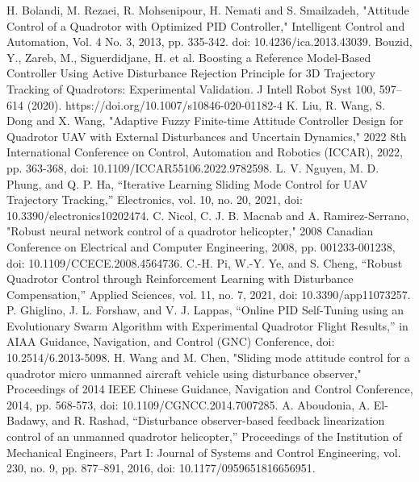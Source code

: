 \documentclass[conference]{IEEEtran}
\begin{document}

\begin{thebibliography}{00}
 H. Bolandi, M. Rezaei, R. Mohsenipour, H. Nemati and S. Smailzadeh, "Attitude Control of a Quadrotor with Optimized PID Controller," Intelligent Control and Automation, Vol. 4 No. 3, 2013, pp. 335-342. doi: 10.4236/ica.2013.43039.
 Bouzid, Y., Zareb, M., Siguerdidjane, H. et al. Boosting a Reference Model-Based Controller Using Active Disturbance Rejection Principle for 3D Trajectory Tracking of Quadrotors: Experimental Validation. J Intell Robot Syst 100, 597–614 (2020). https://doi.org/10.1007/s10846-020-01182-4
 K. Liu, R. Wang, S. Dong and X. Wang, "Adaptive Fuzzy Finite-time Attitude Controller Design for Quadrotor UAV with External Disturbances and Uncertain Dynamics," 2022 8th International Conference on Control, Automation and Robotics (ICCAR), 2022, pp. 363-368, doi: 10.1109/ICCAR55106.2022.9782598.
 L. V. Nguyen, M. D. Phung, and Q. P. Ha, “Iterative Learning Sliding Mode Control for UAV Trajectory Tracking,” Electronics, vol. 10, no. 20, 2021, doi: 10.3390/electronics10202474.
 C. Nicol, C. J. B. Macnab and A. Ramirez-Serrano, "Robust neural network control of a quadrotor helicopter," 2008 Canadian Conference on Electrical and Computer Engineering, 2008, pp. 001233-001238, doi: 10.1109/CCECE.2008.4564736.
 C.-H. Pi, W.-Y. Ye, and S. Cheng, “Robust Quadrotor Control through Reinforcement Learning with Disturbance Compensation,” Applied Sciences, vol. 11, no. 7, 2021, doi: 10.3390/app11073257.
 P. Ghiglino, J. L. Forshaw, and V. J. Lappas, “Online PID Self-Tuning using an Evolutionary Swarm Algorithm with Experimental Quadrotor Flight Results,” in AIAA Guidance, Navigation, and Control (GNC) Conference, doi: 10.2514/6.2013-5098.
 H. Wang and M. Chen, "Sliding mode attitude control for a quadrotor micro unmanned aircraft vehicle using disturbance observer," Proceedings of 2014 IEEE Chinese Guidance, Navigation and Control Conference, 2014, pp. 568-573, doi: 10.1109/CGNCC.2014.7007285.
 A. Aboudonia, A. El-Badawy, and R. Rashad, “Disturbance observer-based feedback linearization control of an unmanned quadrotor helicopter,” Proceedings of the Institution of Mechanical Engineers, Part I: Journal of Systems and Control Engineering, vol. 230, no. 9, pp. 877–891, 2016, doi: 10.1177/0959651816656951.

\end{thebibliography}
\end{document}
